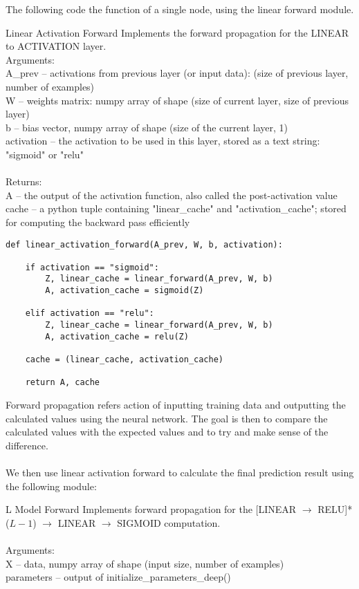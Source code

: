 \documentclass[a4paper]{article}
\begin{document}
\begin{enumerate}
The following code the function of a single node, using the linear forward module. 

\begin{alg}{Linear Activation Forward}{} Implements the forward propagation for the LINEAR to ACTIVATION layer. \\
Arguments: \\
A\_prev -- activations from previous layer (or input data): (size of previous layer, number of examples)\\
W -- weights matrix: numpy array of shape (size of current layer, size of previous layer)\\
b -- bias vector, numpy array of shape (size of the current layer, 1)\\
activation -- the activation to be used in this layer, stored as a text string: "sigmoid" or "relu"\\~\\
Returns:\\
A -- the output of the activation function, also called the post-activation value \\
cache -- a python tuple containing "linear\_cache" and "activation\_cache"; stored for computing the backward pass efficiently\\
\begin{verbatim}
def linear_activation_forward(A_prev, W, b, activation):

    if activation == "sigmoid":
        Z, linear_cache = linear_forward(A_prev, W, b)
        A, activation_cache = sigmoid(Z)
        
    elif activation == "relu":
        Z, linear_cache = linear_forward(A_prev, W, b)
        A, activation_cache = relu(Z) 
        
    cache = (linear_cache, activation_cache)

    return A, cache
\end{verbatim}
\end{alg}

Forward propagation refers action of inputting training data and outputting the calculated values using the neural network. The goal is then to compare the calculated values with the expected values and to try and make sense of the difference. \\~\\

We then use linear activation forward to calculate the final prediction result using the following module: 

\begin{alg}{L Model Forward}{} Implements forward propagation for the [LINEAR $\to$ RELU]*($L-1$) $\to$ LINEAR $\to$ SIGMOID computation. \\~\\
Arguments:\\
X -- data, numpy array of shape (input size, number of examples)\\
parameters -- output of initialize\_parameters\_deep()\\~\\


\end{alg}
\end{enumerate}
\end{document}
